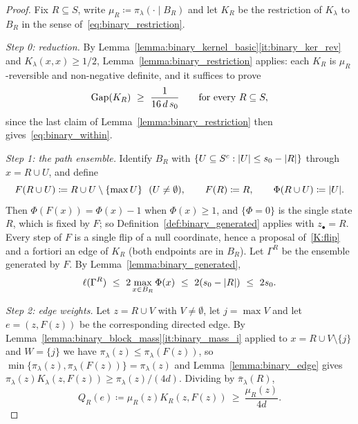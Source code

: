 \documentclass[aos]{imsart}%
\DeclarePairedDelimiter{\abs}{\lvert}{\rvert}
\theoremstyle{plain}
\theoremstyle{definition}
\begin{document}
    \begin{proof}
        Fix $R\subseteq S$, write $\mu_R\coloneq\pi_\lambda(\cdot\mid B_R)$ and
        let $K_R$ be the restriction of $K_\lambda$ to $B_R$ in the sense
        of~\eqref{eq:binary_restriction}.

        \emph{Step 0: reduction.} By
        Lemma~\ref{lemma:binary_kernel_basic}\ref{it:binary_ker_rev} and
        $K_\lambda(x,x)\geq1/2$, Lemma~\ref{lemma:binary_restriction} applies:
        each $K_R$ is $\mu_R$-reversible and non-negative definite, and it
        suffices to prove
        \begin{equation}
            \label{eq:binary_within_goal}
            \mathrm{Gap}(K_R)\ \geq\ \frac{1}{16\,d\,s_0}
            \qquad\text{for every }R\subseteq S,
        \end{equation}
        since the last claim of Lemma~\ref{lemma:binary_restriction} then
        gives~\eqref{eq:binary_within}.

        \emph{Step 1: the path ensemble.} Identify $B_R$ with
        $\{U\subseteq S^{c}:\abs U\leq s_0-\abs R\}$ through $x=R\cup U$, and
        define
        \begin{equation*}
            F(R\cup U)\coloneq R\cup U\setminus\{\max U\}\ \ (U\neq\emptyset),
            \qquad F(R)\coloneq R,
            \qquad \Phi(R\cup U)\coloneq\abs U .
        \end{equation*}
        Then $\Phi(F(x))=\Phi(x)-1$ when $\Phi(x)\geq1$, and $\{\Phi=0\}$ is the
        single state $R$, which is fixed by $F$; so
        Definition~\ref{def:binary_generated} applies with $z_\bullet=R$. Every
        step of $F$ is a single flip of a null coordinate, hence a proposal
        of~\ref{K:flip} and a fortiori an edge of $K_R$ (both endpoints are in
        $B_R$). Let $\Gamma^{R}$ be the ensemble generated by $F$. By
        Lemma~\ref{lemma:binary_generated},
        \begin{equation}
            \label{eq:binary_within_len}
            \Len(\Gamma^{R})\ \leq\ 2\max_{x\in B_R}\Phi(x)
            \ \leq\ 2(s_0-\abs R)\ \leq\ 2s_0 .
        \end{equation}

        \emph{Step 2: edge weights.} Let $z=R\cup V$ with $V\neq\emptyset$, let
        $j=\max V$ and let $e=(z,F(z))$ be the corresponding directed edge.
        By Lemma~\ref{lemma:binary_block_mass}\ref{it:binary_mass_i} applied to
        $x=R\cup V\setminus\{j\}$ and $W=\{j\}$ we have
        $\pi_\lambda(z)\leq\pi_\lambda(F(z))$, so
        $\min\{\pi_\lambda(z),\pi_\lambda(F(z))\}=\pi_\lambda(z)$ and
        Lemma~\ref{lemma:binary_edge} gives
        $\pi_\lambda(z)K_\lambda(z,F(z))\geq\pi_\lambda(z)/(4d)$. Dividing by
        $\bar\pi_\lambda(R)$,
        \begin{equation}
            \label{eq:binary_within_Q}
            Q_R(e)\coloneq\mu_R(z)K_R(z,F(z))\ \geq\ \frac{\mu_R(z)}{4d} .
        \end{equation}


\end{proof}
\end{document}
